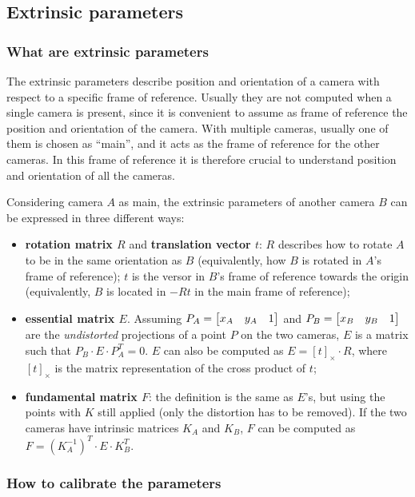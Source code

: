 \subsection{Extrinsic parameters}

\subsubsection{What are extrinsic parameters}

The extrinsic parameters describe position and orientation of a camera with respect to a specific frame of reference.
Usually they are not computed when a single camera is present, since it is convenient to assume as frame of reference the position and orientation of the camera.
With multiple cameras, usually one of them is chosen as ``main'', and it acts as the frame of reference for the other cameras.
In this frame of reference it is therefore crucial to understand position and orientation of all the cameras.

Considering camera $A$ as main, the extrinsic parameters of another camera $B$ can be expressed in three different ways:
\begin{itemize}
	\item \textbf{rotation matrix $R$} and \textbf{translation vector $t$}: $R$ describes how to rotate $A$ to be in the same orientation as $B$ (equivalently, how $B$ is rotated in $A$'s frame of reference); $t$ is the versor in $B$'s frame of reference towards the origin (equivalently, $B$ is located in $-Rt$ in the main frame of reference);
	\item \textbf{essential matrix $E$}. Assuming $P_A=\begin{bmatrix} x_A & y_A & 1 \end{bmatrix}$ and $P_B=\begin{bmatrix} x_B & y_B & 1 \end{bmatrix}$ are the \textit{undistorted} projections of a point $P$ on the two cameras, $E$ is a matrix such that $P_B \cdot E \cdot P_A^T = 0$. $E$ can also be computed as $E = [t]_{\times}{\cdot}R$, where $[t]_{\times}$ is the matrix representation of the cross product of $t$;
	\item \textbf{fundamental matrix $F$}: the definition is the same as $E$'s, but using the points with $K$ still applied (only the distortion has to be removed). If the two cameras have intrinsic matrices $K_A$ and $K_B$, $F$ can be computed as $F = \left(K_A^{-1}\right)^T \cdot E \cdot K_B^T$.
\end{itemize}

\subsubsection{How to calibrate the parameters}

